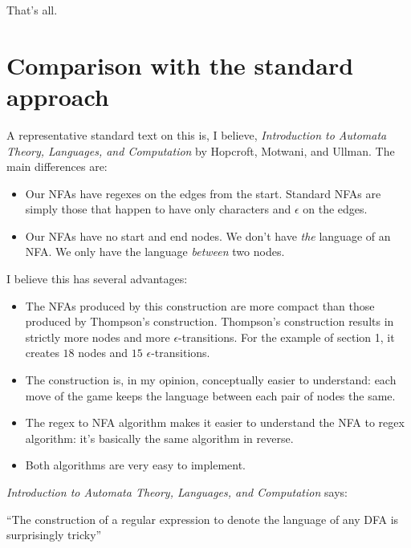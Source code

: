 \documentclass[a4paper, 11pt]{article}
\theoremstyle{definition}
\begin{document}
\noindent That's all.

\newpage
\section{Comparison with the standard approach}

A representative standard text on this is, I believe, \emph{Introduction to Automata Theory, Languages, and Computation} by Hopcroft, Motwani, and Ullman. The main differences are:\bigskip

\begin{itemize}
  \item Our NFAs have regexes on the edges from the start. Standard NFAs are simply those that happen to have only characters and $\epsilon$ on the edges.
  \item Our NFAs have no start and end nodes. We don't have \emph{the} language of an NFA. We only have the language \emph{between} two nodes.
\end{itemize}

\bigskip

\noindent I believe this has several advantages:\bigskip

\begin{itemize}
  \item The NFAs produced by this construction are more compact than those produced by Thompson's construction. Thompson's construction results in strictly more nodes and more $\epsilon$-transitions. For the example of section 1, it creates $18$ nodes and $15$ $\epsilon$-transitions.
  \item The construction is, in my opinion, conceptually easier to understand: each move of the game keeps the language between each pair of nodes the same.
  \item The regex to NFA algorithm makes it easier to understand the NFA to regex algorithm: it's basically the same algorithm in reverse.
  \item Both algorithms are very easy to implement.
\end{itemize}

\bigskip

\noindent \emph{Introduction to Automata Theory, Languages, and Computation} says:

\noindent ``The construction of a regular expression to denote the language of any DFA is surprisingly tricky''

\bigskip
\end{document}
